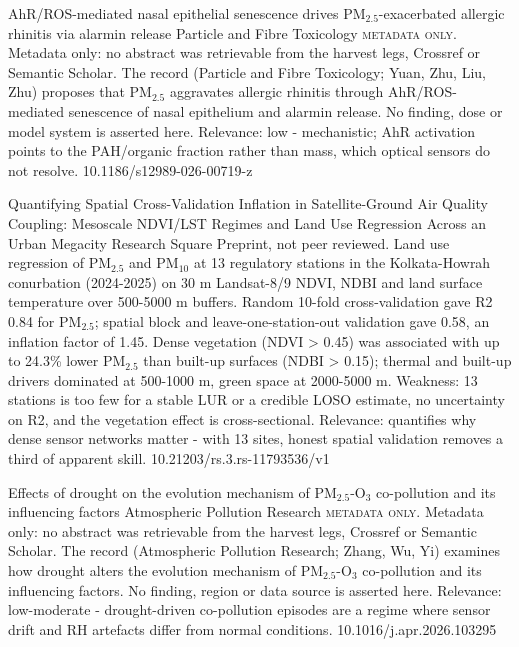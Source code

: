 \documentclass[10pt]{article}
\begin{document}
\par{}\baselineskip{}\baselineskip
{}

{AhR/ROS-mediated nasal epithelial senescence drives PM$_{2.5}$-exacerbated allergic rhinitis via alarmin release}
{Particle and Fibre Toxicology}
{\textsc{metadata only.} Metadata only: no abstract was retrievable from the harvest legs, Crossref or Semantic Scholar. The record (Particle and Fibre Toxicology; Yuan, Zhu, Liu, Zhu) proposes that PM$_{2.5}$ aggravates allergic rhinitis through AhR/ROS-mediated senescence of nasal epithelium and alarmin release. No finding, dose or model system is asserted here. Relevance: low - mechanistic; AhR activation points to the PAH/organic fraction rather than mass, which optical sensors do not resolve.}
{10.1186/s12989-026-00719-z}

\par{}\baselineskip{}\baselineskip
{}

{Quantifying Spatial Cross-Validation Inflation in Satellite-Ground Air Quality Coupling: Mesoscale NDVI/LST Regimes and Land Use Regression Across an Urban Megacity}
{Research Square}
{Preprint, not peer reviewed. Land use regression of PM$_{2.5}$ and PM$_{10}$ at 13 regulatory stations in the Kolkata-Howrah conurbation (2024-2025) on 30 m Landsat-8/9 NDVI, NDBI and land surface temperature over 500-5000 m buffers. Random 10-fold cross-validation gave R2 0.84 for PM$_{2.5}$; spatial block and leave-one-station-out validation gave 0.58, an inflation factor of 1.45. Dense vegetation (NDVI > 0.45) was associated with up to 24.3\% lower PM$_{2.5}$ than built-up surfaces (NDBI > 0.15); thermal and built-up drivers dominated at 500-1000 m, green space at 2000-5000 m. Weakness: 13 stations is too few for a stable LUR or a credible LOSO estimate, no uncertainty on R2, and the vegetation effect is cross-sectional. Relevance: quantifies why dense sensor networks matter - with 13 sites, honest spatial validation removes a third of apparent skill.}
{10.21203/rs.3.rs-11793536/v1}

{Effects of drought on the evolution mechanism of PM$_{2.5}$-O$_3$ co-pollution and its influencing factors}
{Atmospheric Pollution Research}
{\textsc{metadata only.} Metadata only: no abstract was retrievable from the harvest legs, Crossref or Semantic Scholar. The record (Atmospheric Pollution Research; Zhang, Wu, Yi) examines how drought alters the evolution mechanism of PM$_{2.5}$-O$_3$ co-pollution and its influencing factors. No finding, region or data source is asserted here. Relevance: low-moderate - drought-driven co-pollution episodes are a regime where sensor drift and RH artefacts differ from normal conditions.}
{10.1016/j.apr.2026.103295}
\end{document}
